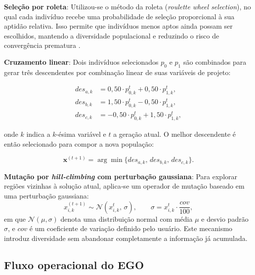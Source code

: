 \textbf{Seleção por roleta}: Utilizou-se o método da roleta (\textit{roulette wheel selection}), no qual cada indivíduo recebe uma probabilidade de seleção proporcional à sua aptidão relativa. Isso permite que indivíduos menos aptos ainda possam ser escolhidos, mantendo a diversidade populacional e reduzindo o risco de convergência prematura \cite{linden}.

\textbf{Cruzamento linear}: Dois indivíduos selecionados \( p_0 \) e \( p_1 \) são combinados para gerar três descendentes por combinação linear de suas variáveis de projeto:

\begin{equation}
\begin{aligned}
{des}_{a,k} &= 0{,}50 \cdot p_{0,k}^{t} + 0{,}50 \cdot p_{1,k}^{t},\\[2pt]
{des}_{b,k} &= 1{,}50 \cdot p_{0,k}^{t} - 0{,}50 \cdot p_{1,k}^{t},\\[2pt]
{des}_{c,k} &= -0{,}50 \cdot p_{0,k}^{t} + 1{,}50 \cdot p_{1,k}^{t},
\end{aligned}
\label{eq:desc_crossover}
\end{equation}

onde \( k \) indica a \( k \)-ésima variável e \( t \) a geração atual. O melhor descendente é então selecionado para compor a nova população:

\begin{equation}
\mathbf{x}^{(t+1)} = \arg\min\bigl\{ {des}_{a,k},\, {des}_{b,k},\, {des}_{c,k} \bigr\}.
\label{eq:melhor_des}
\end{equation}

\textbf{Mutação por \textit{hill‑climbing} com perturbação gaussiana}: Para explorar regiões vizinhas à solução atual, aplica‑se um operador de mutação baseado em uma perturbação gaussiana:
\begin{equation}
x_{i,k}^{(t+1)} \sim \mathcal{N}\!\left(x_{i,k}^{t},\, \sigma\right),
\qquad
\sigma = x_{i,k}^{t} \cdot \frac{\mathit{cov}}{100},
\label{eq:mutacao_gaussiana}
\end{equation}
em que \( \mathcal{N}(\mu,\sigma) \) denota uma distribuição normal com média \( \mu \) e desvio padrão \( \sigma \), e \( \mathit{cov} \) é um coeficiente de variação definido pelo usuário. Este mecanismo introduz diversidade sem abandonar completamente a informação já acumulada.

\subsection{Fluxo operacional do EGO}

